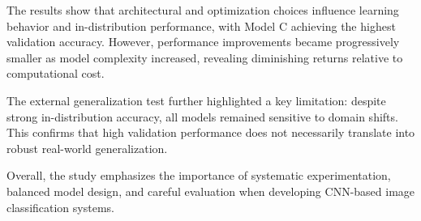 \documentclass[11pt,a4paper]{article}
\begin{document}
The results show that architectural and optimization choices influence learning behavior and in-distribution performance, with Model C achieving the highest validation accuracy. However, performance improvements became progressively smaller as model complexity increased, revealing diminishing returns relative to computational cost.

The external generalization test further highlighted a key limitation: despite strong in-distribution accuracy, all models remained sensitive to domain shifts. This confirms that high validation performance does not necessarily translate into robust real-world generalization.

Overall, the study emphasizes the importance of systematic experimentation, balanced model design, and careful evaluation when developing CNN-based image classification systems.





\end{document}
